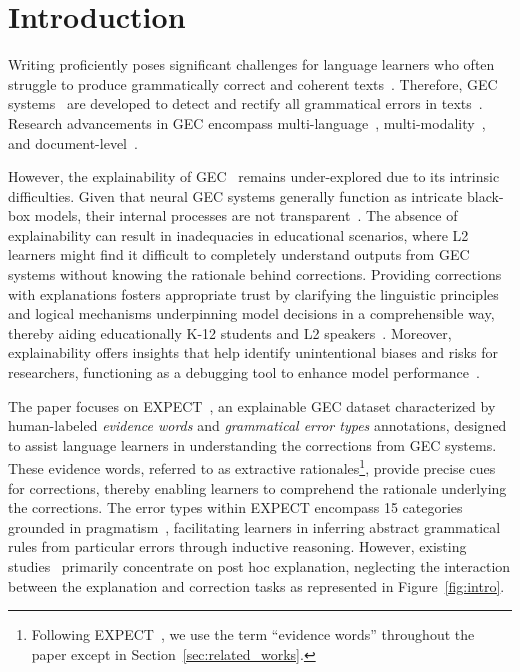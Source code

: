 \section{Introduction}\label{sec:intro}
Writing proficiently poses significant challenges for language learners who often struggle to produce grammatically correct and coherent texts~\citep{li2024rethinking,DBLP:conf/acl/LiZLLLSWLCZ22,DBLP:conf/emnlp/YeLZLM0023}. Therefore, GEC systems~\citep{bryant2023grammatical} are developed to detect and rectify all grammatical errors in texts~\citep{ye-etal-2023-mixedit,huang-etal-2023-frustratingly}. Research advancements in GEC encompass multi-language~\citep{rothe-etal-2021-simple,DBLP:journals/corr/abs-2307-09007,DBLP:conf/emnlp/MaLSZHZLLLCZS22}, multi-modality~\citep{fang-etal-2023-improving,DBLP:conf/emnlp/LiMZLLHLLC022,DBLP:conf/acl/LiXC0LMJLZZS24}, and document-level~\citep{yuan-bryant-2021-document,DBLP:conf/emnlp/DuW0D0LZVZSZGL024}.


However, the explainability of GEC~\citep{hanawa-etal-2021-exploring,DBLP:journals/corr/abs-2407-00924,DBLP:journals/corr/abs-2407-00934} remains under-explored due to its intrinsic difficulties. Given that neural GEC systems generally function as intricate black-box models, their internal processes are not transparent~\citep{zhao2023explainability}. The absence of explainability can result in inadequacies in educational scenarios, where L2 learners might find it difficult to completely understand outputs from GEC systems without knowing the rationale behind corrections. Providing corrections with explanations fosters appropriate trust by clarifying the linguistic principles and logical mechanisms underpinning model decisions in a comprehensible way, thereby aiding educationally K-12 students and L2 speakers~\citep{bitchener2005effect,sheen2007effect,DBLP:journals/eswa/LiMCHHLZS25,ye2025position}. Moreover, explainability offers insights that help identify unintentional biases and risks for researchers, functioning as a debugging tool to enhance model performance~\citep{ludan-etal-2023-explanation,DBLP:conf/icassp/ZhangLZMLCZ23}.



The paper focuses on EXPECT~\citep{fei-etal-2023-enhancing}, an explainable GEC dataset characterized by human-labeled \textit{evidence words} and \textit{grammatical error types} annotations, designed to assist language learners in understanding the corrections from GEC systems. These evidence words, referred to as extractive rationales\footnote{Following EXPECT~\citep{fei-etal-2023-enhancing}, we use the term ``evidence words'' throughout the paper except in Section~\ref{sec:related_works}.}, provide precise cues for corrections, thereby enabling learners to comprehend the rationale underlying the corrections. The error types within EXPECT encompass 15 categories grounded in pragmatism~\citep{skehan1998cognitive,shichungui}, facilitating learners in inferring abstract grammatical rules from particular errors through inductive reasoning. However, existing studies~\citep{song-etal-2024-gee} primarily concentrate on post hoc explanation, neglecting the interaction between the explanation and correction tasks as represented in Figure~\ref{fig:intro}.

